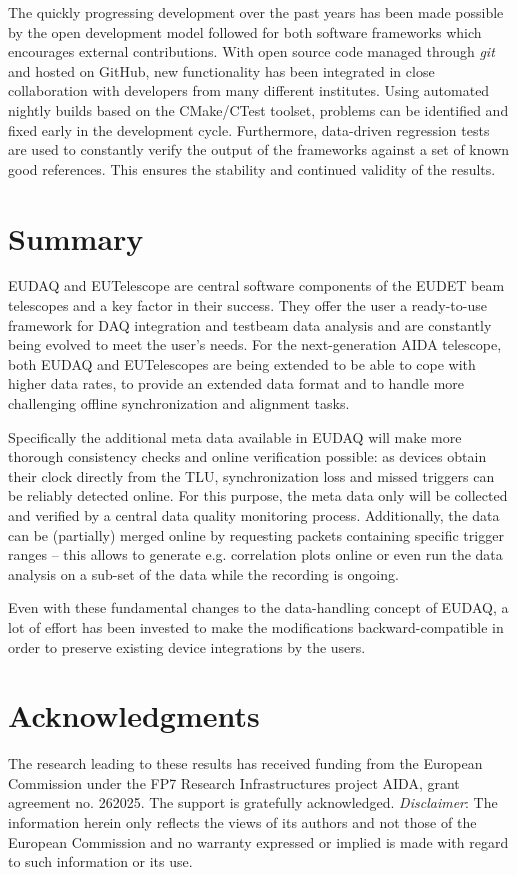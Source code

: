 \documentclass[paper=a4, fontsize=11pt, titlepage]{scrartcl}	%
\numberwithin{equation}{section}		%
\numberwithin{figure}{section}			%
\numberwithin{table}{section}           	%
\begin{document}
The quickly progressing development over the past years has been made
possible by the open development model followed for both software
frameworks which encourages external contributions. With open source
code managed through \emph{git} and hosted on GitHub, new functionality has
been integrated in close collaboration with developers from many different
institutes. Using automated nightly builds based on the CMake/CTest toolset, problems can be
identified and fixed early in the development cycle. Furthermore, data-driven regression
tests are used to constantly verify the output of the frameworks
against a set of known good references. This ensures the stability and
continued validity of the results.


\section{Summary}
EUDAQ and EUTelescope are central software components of the EUDET
beam telescopes and a key factor in their success. They offer the
user a ready-to-use framework for DAQ integration and testbeam data
analysis and are constantly being evolved to meet the user's
needs. For the next-generation AIDA telescope, both EUDAQ and
EUTelescopes are being extended to be able to cope with higher data rates, to
provide an extended data format and to handle more challenging offline
synchronization and alignment tasks.

Specifically the additional meta data available in EUDAQ will make more thorough consistency
checks and online verification possible: as devices obtain their clock
directly from the TLU, synchronization loss and missed triggers can be
reliably detected online. For this purpose, the meta data only will be
collected and verified by a central data quality monitoring
process. Additionally, the data can be (partially) merged online
by requesting packets containing specific trigger ranges -- this
allows to generate e.g. correlation plots online or even run the data
analysis on a sub-set of the data while the recording is ongoing.

Even with these fundamental changes to the data-handling concept of EUDAQ, a lot of
effort has been invested to make the modifications backward-compatible
in order to preserve existing device integrations by the users.




\section{Acknowledgments}

  The research leading to these results has received funding from the
  European Commission under the FP7 Research Infrastructures project
  AIDA, grant agreement no. 262025. The support is gratefully
  acknowledged. 
  \emph{Disclaimer}: The information herein only reflects the views of its authors and not those of the European Commission and no warranty expressed or implied is made with regard to such information or its use.

\printbibliography


\end{document}
